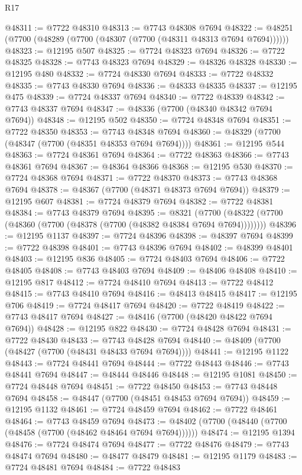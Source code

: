 \begin{lexlean}{R17}
\begin{coremodule}
@48311 := @7722 @48310
@48313 := @7743 @48308 @7694
@48322 := @48251 (@7700 (@48289 (@7700 (@48307 (@7700 (@48311 @48313 @7694 @7694))))))
@48323 := @12195 @507
@48325 := @7724 @48323 @7694
@48326 := @7722 @48325
@48328 := @7743 @48323 @7694
@48329 := @48326 @48328
@48330 := @12195 @480
@48332 := @7724 @48330 @7694
@48333 := @7722 @48332
@48335 := @7743 @48330 @7694
@48336 := @48333 @48335
@48337 := @12195 @475
@48339 := @7724 @48337 @7694
@48340 := @7722 @48339
@48342 := @7743 @48337 @7694
@48347 := @48336 (@7700 (@48340 @48342 @7694 @7694))
@48348 := @12195 @502
@48350 := @7724 @48348 @7694
@48351 := @7722 @48350
@48353 := @7743 @48348 @7694
@48360 := @48329 (@7700 (@48347 (@7700 (@48351 @48353 @7694 @7694))))
@48361 := @12195 @544
@48363 := @7724 @48361 @7694
@48364 := @7722 @48363
@48366 := @7743 @48361 @7694
@48367 := @48364 @48366
@48368 := @12195 @530
@48370 := @7724 @48368 @7694
@48371 := @7722 @48370
@48373 := @7743 @48368 @7694
@48378 := @48367 (@7700 (@48371 @48373 @7694 @7694))
@48379 := @12195 @607
@48381 := @7724 @48379 @7694
@48382 := @7722 @48381
@48384 := @7743 @48379 @7694
@48395 := @8321
    (@7700 (@48322 (@7700 (@48360 (@7700 (@48378 (@7700 (@48382 @48384 @7694 @7694))))))))
@48396 := @12195 @1137
@48397 := @7724 @48396
@48398 := @48397 @7694
@48399 := @7722 @48398
@48401 := @7743 @48396 @7694
@48402 := @48399 @48401
@48403 := @12195 @836
@48405 := @7724 @48403 @7694
@48406 := @7722 @48405
@48408 := @7743 @48403 @7694
@48409 := @48406 @48408
@48410 := @12195 @817
@48412 := @7724 @48410 @7694
@48413 := @7722 @48412
@48415 := @7743 @48410 @7694
@48416 := @48413 @48415
@48417 := @12195 @706
@48419 := @7724 @48417 @7694
@48420 := @7722 @48419
@48422 := @7743 @48417 @7694
@48427 := @48416 (@7700 (@48420 @48422 @7694 @7694))
@48428 := @12195 @822
@48430 := @7724 @48428 @7694
@48431 := @7722 @48430
@48433 := @7743 @48428 @7694
@48440 := @48409 (@7700 (@48427 (@7700 (@48431 @48433 @7694 @7694))))
@48441 := @12195 @1122
@48443 := @7724 @48441 @7694
@48444 := @7722 @48443
@48446 := @7743 @48441 @7694
@48447 := @48444 @48446
@48448 := @12195 @1081
@48450 := @7724 @48448 @7694
@48451 := @7722 @48450
@48453 := @7743 @48448 @7694
@48458 := @48447 (@7700 (@48451 @48453 @7694 @7694))
@48459 := @12195 @1132
@48461 := @7724 @48459 @7694
@48462 := @7722 @48461
@48464 := @7743 @48459 @7694
@48473 := @48402 (@7700 (@48440 (@7700 (@48458 (@7700 (@48462 @48464 @7694 @7694))))))
@48474 := @12195 @1394
@48476 := @7724 @48474 @7694
@48477 := @7722 @48476
@48479 := @7743 @48474 @7694
@48480 := @48477 @48479
@48481 := @12195 @1179
@48483 := @7724 @48481 @7694
@48484 := @7722 @48483

\end{coremodule}
\end{lexlean}
